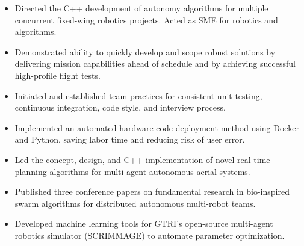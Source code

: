 \documentclass[10pt,a4paper,ragged2e,withhyper]{altacv}
\begin{document}
\begin{paracol}{2}

\begin{itemize}
\item Directed the C++ development of autonomy algorithms for multiple concurrent fixed-wing robotics projects. Acted as SME for robotics and algorithms.
\item Demonstrated ability to quickly develop and scope robust solutions by delivering mission capabilities ahead of schedule and by achieving successful high-profile flight tests.
\item Initiated and established team practices for consistent unit testing, continuous integration, code style, and interview process.
\item Implemented an automated hardware code deployment method using Docker and Python, saving labor time and reducing risk of user error.
\end{itemize}

\divider

\begin{itemize}
\item Led the concept, design, and C++ implementation of novel real-time planning algorithms for multi-agent autonomous aerial systems.
\item Published three conference papers on fundamental research in bio-inspired swarm algorithms for distributed autonomous multi-robot teams.
\item Developed machine learning tools for GTRI's open-source multi-agent robotics simulator (SCRIMMAGE) to automate parameter optimization.
\end{itemize}

\divider


\end{paracol}
\end{document}
